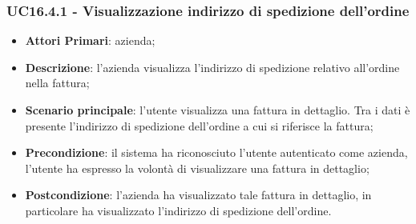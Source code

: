 \subsubsection{UC16.4.1 - Visualizzazione indirizzo di spedizione dell'ordine}
\begin{itemize}
	\item \textbf{Attori Primari}: azienda;
	\item \textbf{Descrizione}: l'azienda visualizza l'indirizzo di spedizione relativo all'ordine nella fattura;
	\item \textbf{Scenario principale}: l'utente visualizza una fattura in dettaglio. Tra i dati è presente l'indirizzo di spedizione dell'ordine a cui si riferisce la fattura;
	\item \textbf{Precondizione}: il sistema ha riconosciuto l'utente autenticato come azienda, l'utente ha espresso la volontà di visualizzare una fattura in dettaglio;
	\item \textbf{Postcondizione}: l'azienda ha visualizzato tale fattura in dettaglio, in particolare ha visualizzato l'indirizzo di spedizione dell'ordine.
\end{itemize} 
